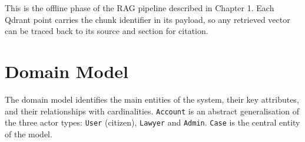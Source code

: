 This is the offline phase of the RAG pipeline described in Chapter 1. Each Qdrant point carries the chunk identifier in its payload, so any retrieved vector can be traced back to its source and section for citation.

\section{Domain Model}

The domain model identifies the main entities of the system, their key attributes, and their relationships with cardinalities. \texttt{Account} is an abstract generalisation of the three actor types: \texttt{User} (citizen), \texttt{Lawyer} and \texttt{Admin}. \texttt{Case} is the central entity of the model.

